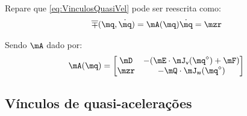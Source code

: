 \documentclass[]{politex}
\begin{document}
Repare que \eqref{eq:VinculosQuasiVel} pode ser reescrita como:
\begin{equation} \label{eq:VinculosQuasiVel2}
\overline{\mp}(\mq,\dot{\mq}) = \mA(\mq) \dot{\mq} = \mzr
\end{equation}

Sendo $\mA$ dado por:
\begin{equation}
\mA(\mq) = 
\begin{bmatrix}
\mD  & -(\mE \cdot \mJ_{\mathsf{v}}(\mq^\diamond) + \mF) \\
\mzr & -\mQ \cdot \mJ_{\mathsf{w}}(\mq^\diamond) \\
\end{bmatrix}
\end{equation}

\subsection{Vínculos de quasi-acelerações} \label{S05-03-02-05}
\end{document}
